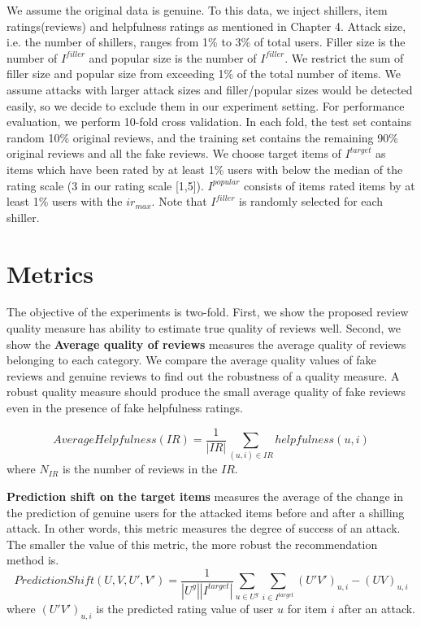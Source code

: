 \documentclass[master,english,final]{kaist-ucs}
\begin{document}
We assume the original data is genuine.
To this data, we inject shillers, item ratings(reviews) and helpfulness ratings as mentioned in Chapter 4.
Attack size, i.e. the number of shillers, ranges from 1\% to 3\% of total users.
Filler size is the number of $I^{filler}$ and popular size is the number of $I^{filler}$.
We restrict the sum of filler size and popular size from exceeding 1\% of the total number of items.
We assume attacks with larger attack sizes and filler/popular sizes would be detected easily, so we decide to exclude them in our experiment setting.
For performance evaluation, we perform 10-fold cross validation.
In each fold, the test set contains random 10\% original reviews, and the training set contains the remaining 90\% original reviews and all the fake reviews.
We choose target items of $I^{target}$ as items which have been rated by at least 1\% users with below the median of the rating scale (3 in our rating scale [1,5]).
$I^{popular}$ consists of items rated items by at least 1\% users with the $ir_{max}$.
Note that $I^{filler}$ is randomly selected for each shiller.


\section{Metrics}
The objective of the experiments is two-fold. 
First, we show the proposed review quality measure has ability to estimate true quality of reviews well.
Second, we show the 
\textbf{Average quality of reviews} measures the average quality of reviews belonging to each category.
We compare the average quality values of fake reviews and genuine reviews to find out the robustness of a quality measure.
A robust quality measure should produce the small average quality of fake reviews even in the presence of fake helpfulness ratings.

\begin{equation}
AverageHelpfulness(IR) = \frac{1}{|IR|} \sum_{ (u,i) \in IR } helpfulness(u,i)
\end{equation}
where $N_{IR}$ is the number of reviews in the $IR$.

\textbf{Prediction shift on the target items} measures the average of the change in the prediction of genuine users for the attacked items before and after a shilling attack.
In other words, this metric measures the degree of success of an attack.
The smaller the value of this metric, the more robust the recommendation method is.
\begin{equation}
PredictionShift(U,V,U',V') = \frac{1}{|U^g||I^{target}|} \sum_{u \in U^g} \sum_{i \in I^{target}} (U'V')_{u,i}-(UV)_{u,i}
\end{equation}
where $(U'V')_{u,i}$ is the predicted rating value of user $u$ for item $i$ after an attack.
\end{document}

